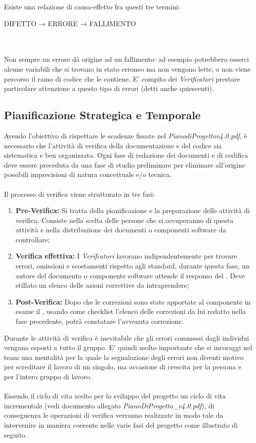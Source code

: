 Esiste una relazione di causa-effetto fra questi tre termini: \begin{center}
	DIFETTO → ERRORE → FALLIMENTO
\end{center}
\\ \\
Non sempre un errore dà origine ad un fallimento: ad esempio potrebbero esserci alcune variabili che si trovano in stato erroneo ma non vengono lette, o non viene percorso il ramo di codice che le contiene. E' compito dei \textit{Verificatori} prestare particolare attenzione a questo tipo di errori (detti anche quiescenti).

\subsection{Pianificazione Strategica e Temporale}
Avendo l'obiettivo di rispettare le scadenze fissate nel \textit{PianodiProgettov4.0.pdf}, è necessario che l'attività di verifica della documentazione e del codice sia sistematica e ben organizzata. Ogni fase di redazione dei documenti e di codifica deve essere preceduta da una fase di studio preliminare per eliminare all'origine possibili imprecisioni di natura concettuale e/o tecnica.
\\ \\Il processo di verifica viene strutturato in tre fasi:
\begin{enumerate}
	\item \textbf{Pre-Verifica:} Si tratta della pianificazione e la preparazione delle attività di verifica. Consiste nella scelta delle persone che si occuperanno di questa attività e nella distribuzione dei documenti o componenti software da controllare;
	\item \textbf{Verifica effettiva:} I \textit{Verifcatori} lavorano indipendentemente per trovare errori, omissioni e scostamenti rispetto agli standard, durante questa fase, un autore del documento o componente software attende il responso del \ruoloVerificatore. Deve stillato un elenco delle azioni correttive da intraprendere;
	\item \textbf{Post-Verifica:} Dopo che le correzioni sono state apportate al componente in esame il \ruoloVerificatore, usando  come checklist l'elenco delle correzioni da lui redatto nella fase precedente, potrà constatare l'avvenuta correzione.
\end{enumerate}
Durante le attività di verifica è inevitabile che gli errori commessi dagli individui vengano esposti a tutto il gruppo. E' quindi molto importante che si incoraggi nel team una mentalità per la quale la segnalazione degli errori non diventi motivo per screditare il lavoro di un singolo, ma occasione di crescita per la persona e per l'intero gruppo di lavoro.\\ \\
Essendo il ciclo di vita scelto per lo sviluppo del progetto un ciclo di vita incrementale (vedi documento allegato \textit{PianoDiProgetto\_v4.0.pdf}), di conseguenza le
operazioni di verifica verranno realizzate in modo tale da intervenire in maniera coerente nelle varie fasi del progetto come illustrato di seguito.

